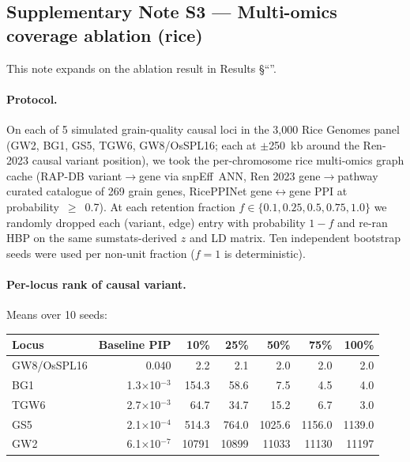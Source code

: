 \clearpage

\subsection*{Supplementary Note S3 --- Multi-omics coverage ablation (rice)}\label{snote:ablation}

This note expands on the ablation result in Results \S``''.

\paragraph{Protocol.} On each of 5 simulated grain-quality causal loci in
the 3{,}000 Rice Genomes panel (GW2, BG1, GS5, TGW6, GW8/OsSPL16; each at
$\pm$250~kb around the Ren-2023 causal variant position), we took the
per-chromosome rice multi-omics graph cache (RAP-DB variant$\to$gene via
snpEff~ANN, Ren 2023 gene$\to$pathway curated catalogue of 269 grain genes,
RicePPINet gene$\leftrightarrow$gene PPI at probability~$\geq$~0.7). At
each retention fraction $f \in \{0.1, 0.25, 0.5, 0.75, 1.0\}$ we randomly
dropped each (variant, edge) entry with probability $1-f$ and re-ran HBP
on the same sumstats-derived $z$ and LD matrix. Ten independent bootstrap
seeds were used per non-unit fraction ($f = 1$ is deterministic).

\paragraph{Per-locus rank of causal variant.} Means over 10 seeds:

\begin{center}
\begin{tabular}{lrrrrrr}
\toprule
\textbf{Locus} & \textbf{Baseline PIP} & \textbf{10\%} & \textbf{25\%} &
\textbf{50\%} & \textbf{75\%} & \textbf{100\%} \\
\midrule
GW8/OsSPL16  & 0.040   &  2.2 &  2.1 &  2.0 &  2.0 &  2.0 \\
BG1          & 1.3$\times$10$^{-3}$ & 154.3 & 58.6 & 7.5 &  4.5 &  4.0 \\
TGW6         & 2.7$\times$10$^{-3}$ &  64.7 & 34.7 & 15.2 &  6.7 &  3.0 \\
GS5          & 2.1$\times$10$^{-4}$ & 514.3 & 764.0 & 1025.6 & 1156.0 & 1139.0 \\
GW2          & 6.1$\times$10$^{-7}$ &10791 &10899 &11033 &11130 &11197 \\
\bottomrule
\end{tabular}
\end{center}

